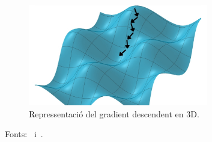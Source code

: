     \begin{figure}[H]
    \centering
    \includegraphics[width=0.7\textwidth]{./figures/gradient_descendent3d.png}
    \caption{Repressentació del gradient descendent en 3D.~\cite{Img_3d}}
    \label{f:gradient3D}
    \end{figure}


\bigskip

Fonts:~\cite{IBM_Gradient} i~\cite{Video_Gradient}.

%
%
%

